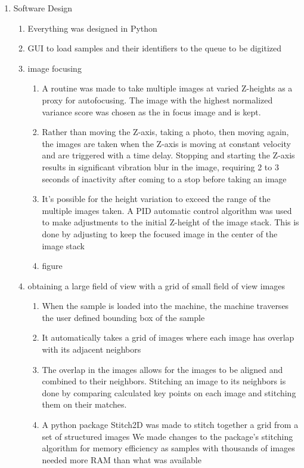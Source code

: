 \documentclass{article}
\begin{document}
\begin{outline}[enumerate]
\begin{enumerate}
		\item Software Design
			\begin{enumerate}
				\item Everything was designed in Python 
				\item GUI to load samples and their identifiers to the queue to be digitized
				\item image focusing
					\begin{enumerate}
					\item A routine was made to take multiple images at varied Z-heights as a proxy for autofocusing. The image with the highest normalized variance score was chosen as the in focus image and is kept. %
					\item Rather than moving the Z-axis, taking a photo, then moving again, the images are taken when the Z-axis is moving at constant velocity and are triggered with a time delay. Stopping and starting the Z-axis results in significant vibration blur in the image, requiring 2 to 3 seconds of inactivity after coming to a stop before taking an image
					\item It's possible for the height variation to exceed the range of the multiple images taken. A PID automatic control algorithm was used to make adjustments to the initial Z-height of the image stack. This is done by adjusting to keep the focused image in the center of the image stack %
					\item figure
					\end{enumerate}
				\item obtaining a large field of view with a grid of small field of view images 
					\begin{enumerate}
						\item When the sample is loaded into the machine, the machine traverses the user defined bounding box of the sample
						\item It automatically takes a grid of images where each image has overlap with its adjacent neighbors
						\item The overlap in the images allows for the images to be aligned and combined to their neighbors. Stitching an image to its neighbors is done by comparing calculated key points on each image and stitching them on their matches.
						\item A python package Stitch2D was made to stitch together a grid from a set of structured images %
							\subitem We made changes to the package's stitching algorithm for memory efficiency as samples with thousands of images needed more RAM than what was available

\end{enumerate}
\end{enumerate}
\end{enumerate}
\end{outline}
\end{document}
